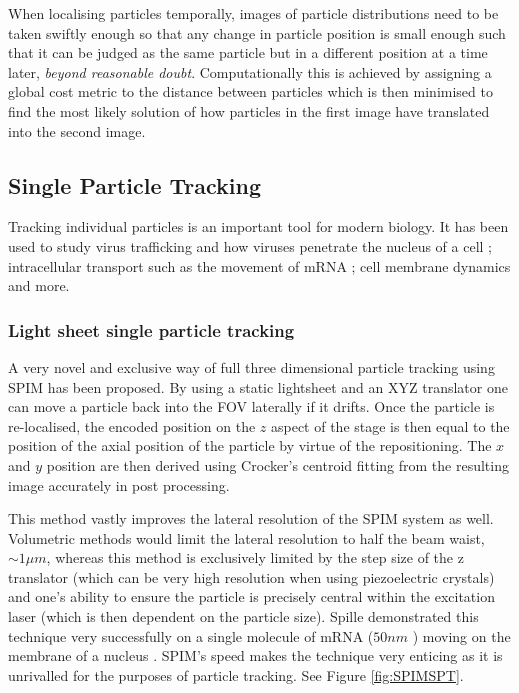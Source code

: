 When localising particles temporally, images of particle distributions need to be taken swiftly enough so that any change in particle position is small enough such that it can be judged as the same particle but in a different position at a  time later, \textit{beyond reasonable doubt}. Computationally this is achieved by assigning a global cost metric to the distance between particles which is then minimised to find the most likely solution of how particles in the first image have translated into the second image.

\subsection{Single Particle Tracking}

Tracking individual particles is an important tool for modern biology. It has been used to study virus trafficking and how viruses penetrate the nucleus of a cell \cite{Brandenburg2007}; intracellular transport such as the movement of mRNA \cite{Spille2015a}; cell membrane dynamics \cite{Cognet2014} and more.


\subsubsection{Light sheet single particle tracking}

A very novel and exclusive way of full three dimensional particle tracking using SPIM has been proposed. By using a static lightsheet and an XYZ translator one can move a particle back into the FOV laterally if it drifts. Once the particle is re-localised, the encoded position on the $z$ aspect of the stage is then equal to the position of the axial position of the particle by virtue of the repositioning. The $x$ and $y$ position are then derived using Crocker's centroid fitting from the resulting image accurately in post processing.

This method vastly improves the lateral resolution of the SPIM system as well. Volumetric methods would limit the lateral resolution to half the beam waist, $\sim 1 \mu m$, whereas this method is exclusively limited by the step size of the z translator (which can be very high resolution when using piezoelectric crystals) and one's ability to ensure the particle is precisely central within the excitation laser (which is then dependent on the particle size). Spille demonstrated this technique very successfully on a single molecule of mRNA ($50 nm$ \cite{Spille2015a}) moving on the membrane of a nucleus \cite{Spille2015a}. SPIM's speed makes the technique very enticing as it is unrivalled for the purposes of particle tracking. See Figure \ref{fig:SPIMSPT}.

